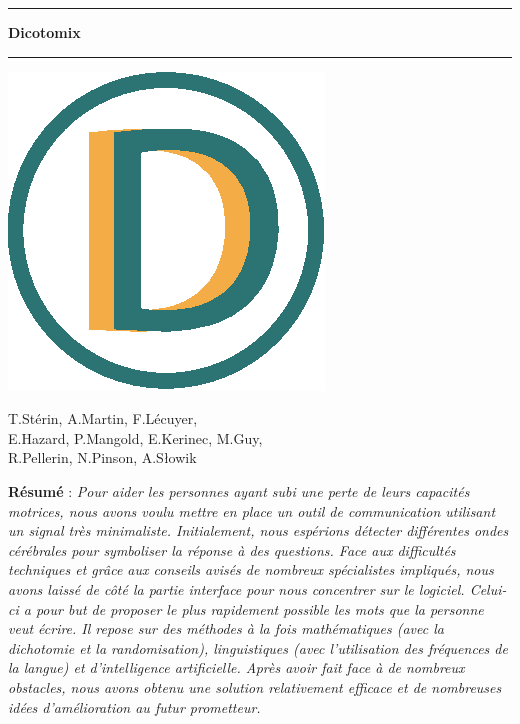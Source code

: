 \documentclass[11pt,a4paper]{article}
\theoremstyle{plain}
\theoremstyle{definition}
\begin{document}
\begin{center}


\vspace{1.5cm}

\rule[11pt]{5cm}{0.5pt}

\textbf{\huge Dicotomix}

\rule{5cm}{0.5pt}
\vspace{0.5cm}

\includegraphics[scale=0.7]{images/icon.eps}

\vspace{0.5cm}

T.Stérin, A.Martin, F.Lécuyer, \\ E.Hazard, P.Mangold, E.Kerinec, M.Guy, \\ R.Pellerin, N.Pinson, A.Słowik

\vspace{1.5cm}

\parbox{15cm}{\small
\textbf{Résumé} : \it Pour aider les personnes ayant subi une perte de leurs capacités motrices, nous avons voulu mettre en place un outil de communication utilisant un signal très minimaliste. Initialement, nous espérions détecter différentes ondes cérébrales pour symboliser la réponse à des questions. Face aux difficultés techniques et grâce aux conseils avisés de nombreux spécialistes impliqués, nous avons laissé de côté la partie interface pour nous concentrer sur le logiciel. Celui-ci a pour but de proposer le plus rapidement possible les mots que la personne veut écrire. Il repose sur des méthodes à la fois mathématiques (avec la dichotomie et la randomisation), linguistiques (avec l'utilisation des fréquences de la langue) et d'intelligence artificielle. Après avoir fait face à de nombreux obstacles, nous avons obtenu une solution relativement efficace et de nombreuses idées d'amélioration au futur prometteur.

}
\end{center}
\end{document}
